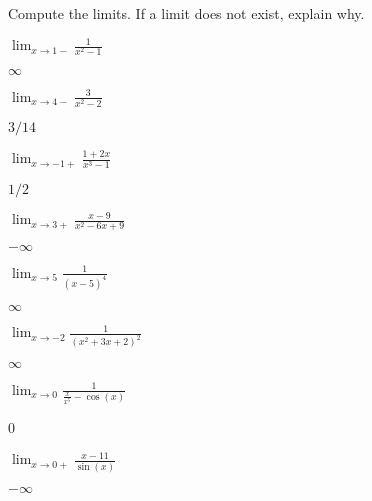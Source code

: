 \begin{exercises}

\noindent Compute the limits. If a limit does not exist, explain why.
\twocol
\begin{exercise}
$\lim_{x\to 1-} \frac{1}{x^2-1}$
\begin{answer}
  $\infty$
\end{answer}
\end{exercise}

\begin{exercise}
$\lim_{x\to 4-} \frac{3}{x^2-2}$
\begin{answer}
  $3/14$
\end{answer}
\end{exercise}

\begin{exercise}
$\lim_{x\to -1+} \frac{1+2x}{x^3-1}$
\begin{answer}
  $1/2$
\end{answer}
\end{exercise}

\begin{exercise}
$\lim_{x\to 3+} \frac{x-9}{x^2-6x+9}$
\begin{answer}
  $-\infty$
\end{answer}
\end{exercise}

\begin{exercise}
$\lim_{x\to 5} \frac{1}{(x-5)^4}$
\begin{answer}
  $\infty$
\end{answer}
\end{exercise}


\begin{exercise}
$\lim_{x\to -2} \frac{1}{(x^2+3x+2)^2}$
\begin{answer}
  $\infty$
\end{answer}
\end{exercise}


\begin{exercise}
$\lim_{x\to 0} \frac{1}{\frac{x}{x^5}-\cos(x)}$
\begin{answer}
  0
\end{answer}
\end{exercise}

\begin{exercise}
$\lim_{x\to 0+} \frac{x-11}{\sin(x)}$
\begin{answer}
  $-\infty$
\end{answer}
\end{exercise}



\end{exercises}
